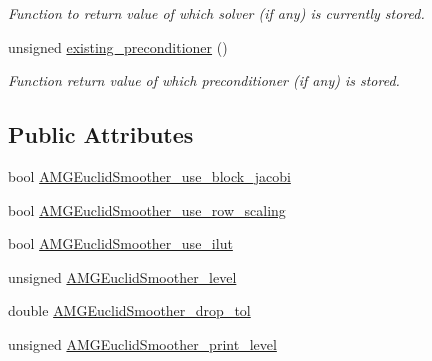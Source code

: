 \begin{DoxyCompactItemize}
\begin{DoxyCompactList}\small\item\em Function to return value of which solver (if any) is currently stored. \end{DoxyCompactList}\item 
unsigned \hyperlink{classoomph_1_1HypreInterface_a49751f00702cd3176ee61c4b226424eb}{existing\+\_\+preconditioner} ()
\begin{DoxyCompactList}\small\item\em Function return value of which preconditioner (if any) is stored. \end{DoxyCompactList}\end{DoxyCompactItemize}
\subsection*{Public Attributes}
\begin{DoxyCompactItemize}
\item 
bool \hyperlink{classoomph_1_1HypreInterface_a79fa8ccf580df282a6a2955e3d5327ae}{A\+M\+G\+Euclid\+Smoother\+\_\+use\+\_\+block\+\_\+jacobi}
\item 
bool \hyperlink{classoomph_1_1HypreInterface_a3570de904e329445f987481d61821b0f}{A\+M\+G\+Euclid\+Smoother\+\_\+use\+\_\+row\+\_\+scaling}
\item 
bool \hyperlink{classoomph_1_1HypreInterface_a4ead069d2811580d1f7a743a0c5569b1}{A\+M\+G\+Euclid\+Smoother\+\_\+use\+\_\+ilut}
\item 
unsigned \hyperlink{classoomph_1_1HypreInterface_a3677d64e347986f0693acb90ab9510fb}{A\+M\+G\+Euclid\+Smoother\+\_\+level}
\item 
double \hyperlink{classoomph_1_1HypreInterface_a0dab8a5b8cc96e3d1c38960735f3fbee}{A\+M\+G\+Euclid\+Smoother\+\_\+drop\+\_\+tol}
\item 
unsigned \hyperlink{classoomph_1_1HypreInterface_a75e69886d00203474a4eea60c751fa39}{A\+M\+G\+Euclid\+Smoother\+\_\+print\+\_\+level}
\end{DoxyCompactItemize}
